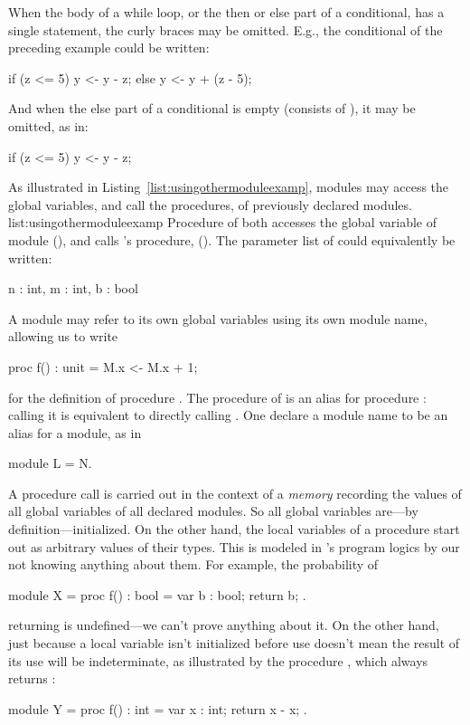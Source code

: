 When the body of a while loop, or the then or else part of a conditional,
has a single statement, the curly braces may be omitted. E.g., the
conditional of the preceding example could be written:
\begin{easycrypt}{}{}
if (z <= 5) y <- y - z;
else y <- y + (z - 5);
\end{easycrypt}
And when the else part of a conditional is empty (consists of
\ec{\{\}}), it may be omitted, as in:
\begin{easycrypt}{}{}
if (z <= 5) y <- y - z;
\end{easycrypt}

As illustrated in Listing~\ref{list:usingothermoduleexamp}, modules may
access the global variables, and call the procedures, of previously
declared modules.
 {}{list:usingothermoduleexamp} Procedure
 of  both accesses the global variable  of module
 (), and calls 's procedure,  ().
The parameter list of  could equivalently be written:
\begin{easycrypt}{}{}
n : int, m : int, b : bool  
\end{easycrypt}
A module may refer to its own global variables using its own module
name, allowing us to write
\begin{easycrypt}{}{}
proc f() : unit = {
  M.x <- M.x + 1;
}
\end{easycrypt}
for the definition of procedure .  The procedure  of
 is an alias for procedure : calling it is equivalent to
directly calling .
One declare a module name to be an alias for a module, as in
\begin{easycrypt}{}{}
module L = N.
\end{easycrypt}

A procedure call is carried out in the context of a \emph{memory}
recording the values of all global variables of all declared modules.
So all global variables are---by definition---initialized. On the
other hand, the local variables of a procedure start out as arbitrary
values of their types.  This is modeled in \EasyCrypt's program logics
by our not knowing anything about them. For example, the probability
of 
\begin{easycrypt}{}{}
module X = {
  proc f() : bool = {
    var b : bool;
    return b;
  }
}.
\end{easycrypt}
returning  is undefined---we can't prove anything about it.
On the other hand, just because a local variable isn't initialized
before use doesn't mean the result of its use will be indeterminate,
as illustrated by the procedure , which always returns :
\begin{easycrypt}{}{}
module Y = {
  proc f() : int = {
    var x : int;
    return x - x;
  }
}.
\end{easycrypt}

